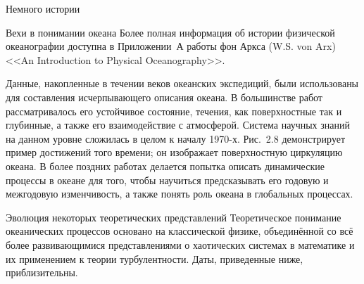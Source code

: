 \begin{chapter}{Немного истории}
\begin{section}{Вехи в понимании океана}
Более полная информация об истории физической океанографии доступна
в Приложении~А работы фон Аркса (W.S. von Arx) <<An Introduction
to Physical Oceanography>>.
%

Данные, накопленные в течении веков океанских экспедиций, были
использованы для составления исчерпывающего описания океана.
В большинстве работ рассматривалось его устойчивое состояние, 
течения, как поверхностные так и глубинные, а также его взаимодействие с
атмосферой. Система научных знаний на данном уровне сложилась в целом   
к началу 1970-х. Рис.~2.8 демонстрирует пример достижений того времени; 
он изображает поверхностную циркуляцию океана. 
В более поздних работах делается попытка описать динамические
процессы в океане для того, чтобы научиться предсказывать его годовую и
межгодовую изменчивость, а также понять роль океана в глобальных
процессах.
%
\end{section}

\begin{section}{Эволюция некоторых теоретических представлений}
Теоретическое понимание океанических процессов основано на
классической физике, объединённой со всё более развивающимися
представлениями о хаотических системах в математике и их применением
к теории турбулентности. Даты, приведенные ниже, приблизительны.
%


\end{section}
\end{chapter}
